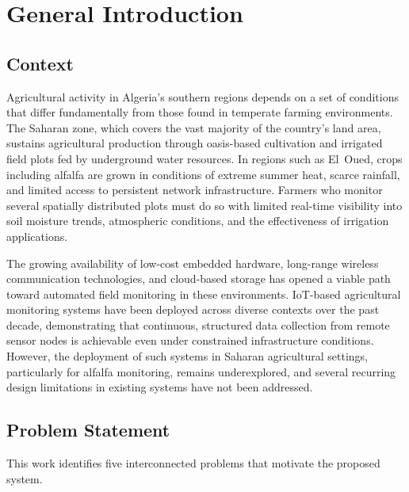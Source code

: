 
\chapter*{General Introduction}
\label{chap:general-introduction}

\section*{Context}

Agricultural activity in Algeria's southern regions depends on a set of conditions
that differ fundamentally from those found in temperate farming environments. The
Saharan zone, which covers the vast majority of the country's land area, sustains
agricultural production through oasis-based cultivation and irrigated field plots
fed by underground water resources. In regions such as El~Oued, crops including
alfalfa are grown in conditions of extreme summer heat, scarce rainfall, and limited
access to persistent network infrastructure. Farmers who monitor several spatially
distributed plots must do so with limited real-time visibility into soil moisture
trends, atmospheric conditions, and the effectiveness of irrigation applications.

The growing availability of low-cost embedded hardware, long-range wireless
communication technologies, and cloud-based storage has opened a viable path toward
automated field monitoring in these environments. IoT-based agricultural monitoring
systems have been deployed across diverse contexts over the past decade, demonstrating
that continuous, structured data collection from remote sensor nodes is achievable
even under constrained infrastructure conditions. However, the deployment of such
systems in Saharan agricultural settings, particularly for alfalfa monitoring,
remains underexplored, and several recurring design limitations in existing systems
have not been addressed.

\section*{Problem Statement}

This work identifies five interconnected problems that motivate the proposed system.

